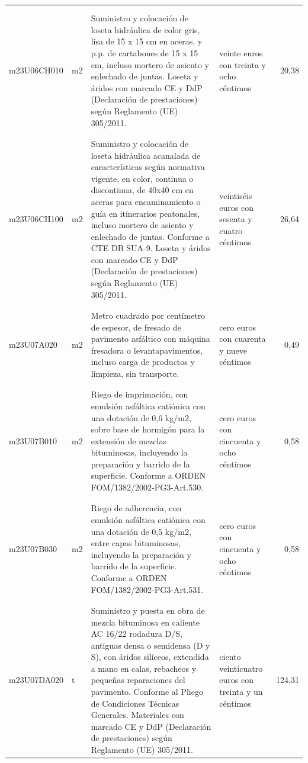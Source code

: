 \documentclass{book}%
\begin{document}
\begin{supertabular}{|l|l|p{5cm}|p{3cm}|r|}
&&&&\\%
&&&&\\%
m23U06CH010&m2&Suministro y colocación de loseta hidráulica de color gris, lisa de 15 x 15 cm en aceras, y p.p. de cartabones de 15 x 15 cm, incluso mortero de asiento y enlechado de juntas. Loseta y áridos con marcado CE y DdP (Declaración de prestaciones) según Reglamento (UE) 305/2011.&veinte euros con treinta y ocho céntimos&20,38\\%
&&&&\\%
&&&&\\%
m23U06CH100&m2&Suministro y colocación de loseta hidráulica acanalada de características según normativa vigente, en color, continua o discontinua, de 40x40 cm en aceras para encaminamiento o guía en itinerarios peatonales, incluso mortero de asiento y enlechado de juntas. Conforme a CTE DB SUA{-}9. Loseta y áridos con marcado CE y DdP (Declaración de prestaciones) según Reglamento (UE) 305/2011.&veintiséis euros con sesenta y cuatro céntimos&26,64\\%
&&&&\\%
&&&&\\%
m23U07A020&m2&Metro cuadrado por centímetro de espesor, de fresado de pavimento asfáltico con máquina fresadora o levantapavimentos, incluso carga de productos y limpieza, sin transporte.&cero euros con cuarenta y nueve céntimos&0,49\\%
&&&&\\%
&&&&\\%
m23U07B010&m2&Riego de imprimación, con emulsión asfáltica catiónica con una dotación de 0,6 kg/m2, sobre base de hormigón para la extensión de mezclas bituminosas, incluyendo la preparación y barrido de la superficie. Conforme a ORDEN FOM/1382/2002{-}PG3{-}Art.530.&cero euros con cincuenta y ocho céntimos&0,58\\%
&&&&\\%
&&&&\\%
m23U07B030&m2&Riego de adherencia, con emulsión asfáltica catiónica con una dotación de 0,5 kg/m2, entre capas bituminosas, incluyendo la preparación y barrido de la superficie. Conforme a ORDEN FOM/1382/2002{-}PG3{-}Art.531.&cero euros con cincuenta y ocho céntimos&0,58\\%
&&&&\\%
&&&&\\%
m23U07DA020&t&Suministro y puesta en obra de mezcla bituminosa en caliente AC 16/22 rodadura D/S, antiguas densa o semidensa (D y S), con áridos silíceos, extendida a mano en calas, rebacheos y pequeñas reparaciones del pavimento. Conforme al Pliego de Condiciones Técnicas Generales. Materiales con marcado CE y DdP (Declaración de prestaciones) según Reglamento (UE) 305/2011.&ciento veinticuatro euros con treinta y un céntimos&124,31\\%

\end{supertabular}
\end{document}
